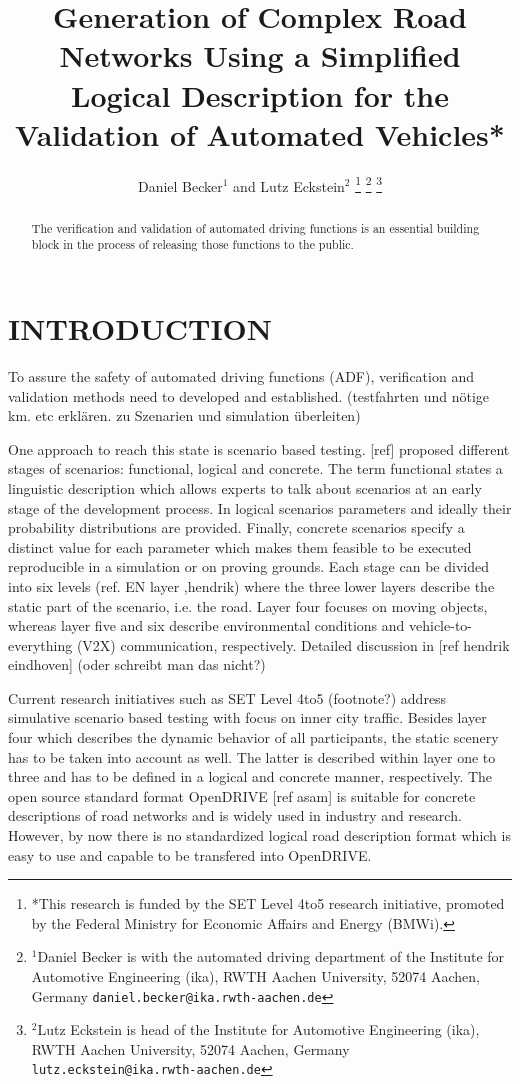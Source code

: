 \documentclass[a4paper, 10pt, conference]{ieeeconf}      %
\title{\LARGE \bf
Generation of Complex Road Networks Using a Simplified Logical Description for the Validation of Automated Vehicles*
}
\author{Daniel Becker$^{1}$ and Lutz Eckstein$^{2}$%
\thanks{*This research is funded by the SET Level 4to5 research initiative, promoted by the	Federal Ministry for Economic Affairs and Energy (BMWi).}%
\thanks{$^{1}$Daniel Becker is with the automated driving department of the Institute
	for Automotive Engineering (ika), RWTH Aachen University, 52074
	Aachen, Germany {\tt\small daniel.becker@ika.rwth-aachen.de}}%
\thanks{$^{2}$Lutz Eckstein is head of the Institute for Automotive Engineering
	(ika), RWTH Aachen University, 52074 Aachen, Germany {\tt\small lutz.eckstein@ika.rwth-aachen.de}}%
}
\begin{document}
\maketitle
\thispagestyle{empty}
\pagestyle{empty}


\begin{abstract}
The verification and validation of automated driving functions is an essential building block in the process of releasing those functions to the public. 
\end{abstract}


\section{INTRODUCTION}

To assure the safety of automated driving functions (ADF), verification and validation methods need to developed and established. (testfahrten und nötige km. etc erklären. zu Szenarien und simulation überleiten)

One approach to reach this state is scenario based testing. [ref] proposed different stages of scenarios: functional, logical and concrete. The term functional states a linguistic description which allows experts to talk about scenarios at an early stage of the development process. In logical scenarios parameters and ideally their probability distributions are provided. Finally, concrete scenarios specify a distinct value for each parameter which makes them feasible to be executed reproducible in a simulation or on proving grounds. Each stage can be divided into six levels (ref. EN layer ,hendrik) where the three lower layers describe the static part of the scenario, i.e. the road. Layer four focuses on moving objects, whereas layer five and six describe environmental conditions and vehicle-to-everything (V2X) communication, respectively. Detailed discussion in [ref hendrik eindhoven] (oder schreibt man das nicht?)

Current research initiatives such as SET Level 4to5 (footnote?) address simulative scenario based testing with focus on inner city traffic. Besides layer four which describes the dynamic behavior of all participants, the static scenery has to be taken into account as well. The latter is described within layer one to three and has to be defined in a logical and concrete manner, respectively. The open source standard format OpenDRIVE [ref asam] is suitable for concrete descriptions of road networks and is widely used in industry and research. However, by now there is no standardized logical road description format which is easy to use and capable to be transfered into OpenDRIVE. 
\end{document}
